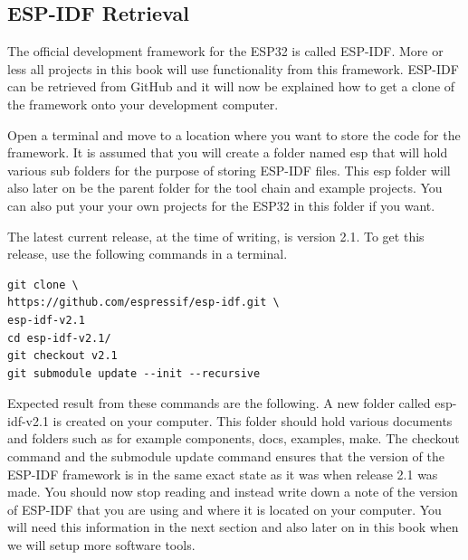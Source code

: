 \documentclass{tufte-book}
\begin{document}
\subsection{ESP-IDF Retrieval}


The official development framework for the ESP32 is called ESP-IDF. More or less all projects in this book will use functionality from this framework. ESP-IDF can be retrieved from GitHub and it will now be explained how to get a clone of the framework onto your development computer.

Open a terminal and move to a location where you want to store the code for the framework. It is assumed that you will create a folder named esp that will hold various sub folders for the purpose of storing ESP-IDF files. This esp folder will also later on be the parent folder for the tool chain and example projects. You can also put your your own projects for the ESP32 in this folder if you want.


The latest current release, at the time of writing, is version 2.1. To get this release, use the following commands in a terminal.

\begin{lstlisting}
git clone \
https://github.com/espressif/esp-idf.git \
esp-idf-v2.1
cd esp-idf-v2.1/
git checkout v2.1
git submodule update --init --recursive
\end{lstlisting}

Expected result from these commands are the following. A new folder called esp-idf-v2.1 is created on your computer. This folder should hold various documents and folders such as for example components, docs, examples, make. The checkout command and the submodule update command ensures that the version of the ESP-IDF framework is in the same exact state as it was when release 2.1 was made.
You should now stop reading and instead write down a note of the version of ESP-IDF that you are using and where it is located on your computer. You will need this information in the next section and also later on in this book when we will setup more software tools.
\end{document}

